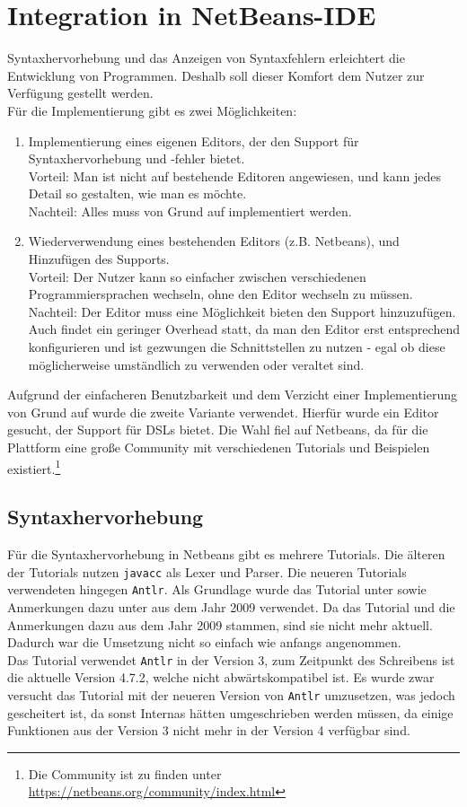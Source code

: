 
\chapter{Integration in NetBeans-IDE}

Syntaxhervorhebung und das Anzeigen von Syntaxfehlern erleichtert die Entwicklung von Programmen.
Deshalb soll dieser Komfort dem Nutzer zur Verfügung gestellt werden.\\
Für die Implementierung gibt es zwei Möglichkeiten:
\begin{enumerate}
\item Implementierung eines eigenen Editors, der den Support für Syntaxhervorhebung und -fehler bietet.\\
Vorteil: Man ist nicht auf bestehende Editoren angewiesen, und kann jedes Detail so gestalten, wie man es möchte.\\
Nachteil: Alles muss von Grund auf implementiert werden.
\item Wiederverwendung eines bestehenden Editors (z.B. Netbeans), und Hinzufügen des Supports.\\
Vorteil: Der Nutzer kann so einfacher zwischen verschiedenen Programmiersprachen wechseln, ohne den Editor wechseln zu müssen.\\
Nachteil: Der Editor muss eine Möglichkeit bieten den Support hinzuzufügen.
Auch findet ein geringer Overhead statt, da man den Editor erst entsprechend konfigurieren und ist gezwungen die Schnittstellen zu nutzen - egal ob diese möglicherweise umständlich zu verwenden oder veraltet sind.
\end{enumerate}
Aufgrund der einfacheren Benutzbarkeit und dem Verzicht einer Implementierung von Grund auf wurde die zweite Variante verwendet.
Hierfür wurde ein Editor gesucht, der Support für \acp{DSL} bietet.
Die Wahl fiel auf Netbeans, da für die Plattform eine große Community mit verschiedenen Tutorials und Beispielen existiert.\footnote{Die Community ist zu finden unter \url{https://netbeans.org/community/index.html}}

\section{Syntaxhervorhebung}
Für die Syntaxhervorhebung in Netbeans gibt es mehrere Tutorials.
Die älteren der Tutorials nutzen \texttt{javacc} als Lexer und Parser.
Die neueren Tutorials verwendeten hingegen \texttt{Antlr}.
Als Grundlage wurde das Tutorial unter \cite{netbeansSyntax} sowie Anmerkungen dazu unter \cite{netbeansSyntaxNotes} aus dem Jahr 2009 verwendet.
Da das Tutorial und die Anmerkungen dazu aus dem Jahr 2009 stammen, sind sie nicht mehr aktuell.
Dadurch war die Umsetzung nicht so einfach wie anfangs angenommen.\\
Das Tutorial verwendet \texttt{Antlr} in der Version 3, zum Zeitpunkt des Schreibens ist die aktuelle Version 4.7.2, welche nicht abwärtskompatibel ist.
Es wurde zwar versucht das Tutorial mit der neueren Version von \texttt{Antlr} umzusetzen, was jedoch gescheitert ist, da sonst Internas hätten umgeschrieben werden müssen, da einige Funktionen aus der Version 3 nicht mehr in der Version 4 verfügbar sind.\\

